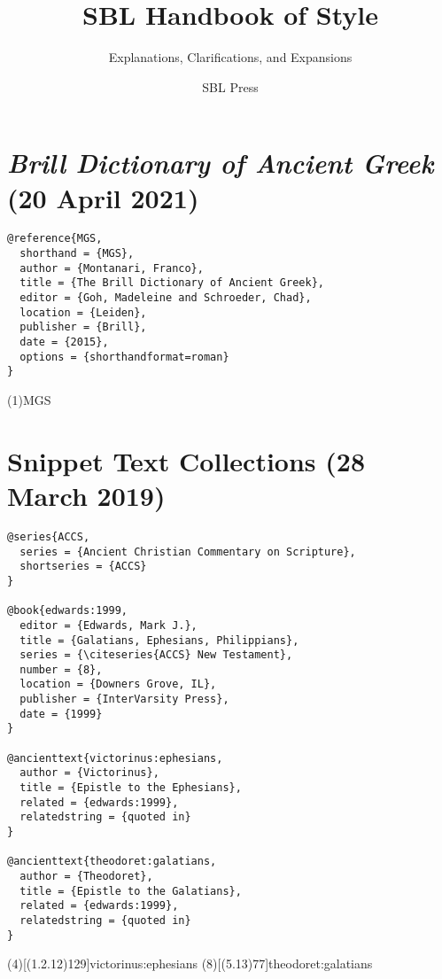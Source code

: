 \documentclass[a4paper]{article}
\begin{document}
\title{SBL Handbook of Style}
\author{Explanations, Clarifications, and Expansions}
\date{SBL Press}
\maketitle

\tableofcontents

\section{\emph{Brill Dictionary of Ancient Greek} (20 April 2021)}

\begin{verbatim}
@reference{MGS,
  shorthand = {MGS},
  author = {Montanari, Franco},
  title = {The Brill Dictionary of Ancient Greek},
  editor = {Goh, Madeleine and Schroeder, Chad},
  location = {Leiden},
  publisher = {Brill},
  date = {2015},
  options = {shorthandformat=roman}
}
\end{verbatim}

\examplecite(1){MGS}
\exampleabbreviations
{}

\section{Snippet Text Collections (28 March 2019)}

\begin{verbatim}
@series{ACCS,
  series = {Ancient Christian Commentary on Scripture},
  shortseries = {ACCS}
}

@book{edwards:1999,
  editor = {Edwards, Mark J.},
  title = {Galatians, Ephesians, Philippians},
  series = {\citeseries{ACCS} New Testament},
  number = {8},
  location = {Downers Grove, IL},
  publisher = {InterVarsity Press},
  date = {1999}
}

@ancienttext{victorinus:ephesians,
  author = {Victorinus},
  title = {Epistle to the Ephesians},
  related = {edwards:1999},
  relatedstring = {quoted in}
}

@ancienttext{theodoret:galatians,
  author = {Theodoret},
  title = {Epistle to the Galatians},
  related = {edwards:1999},
  relatedstring = {quoted in}
}
\end{verbatim}

\examplecite(4)[(1.2.12)129]{victorinus:ephesians}
\examplecite(8)[(5.13)77]{theodoret:galatians}
\exampleabbreviations
\examplebibliography
{}
\end{document}
